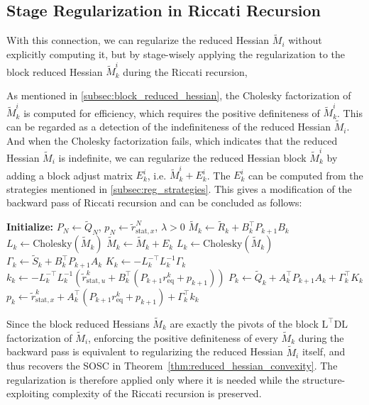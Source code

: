 \documentclass[class=scrbook, crop=false]{standalone}
\begin{document}
\subsection{Stage Regularization in Riccati Recursion}
With this connection, we can regularize the reduced Hessian $\tilde{M}_i$ without explicitly computing it, 
but by stage-wisely applying the regularization to the block reduced Hessian  $\tilde{M}_k^i$ during the Riccati recursion,

As mentioned in \ref{subsec:block_reduced_hessian}, 
the Cholesky factorization of $\tilde{M}_k^i$ is computed for efficiency, which requires the positive definiteness of $\tilde{M}_k^i$.
This can be regarded as a detection of the indefiniteness of the reduced Hessian $\tilde{M}_i$.
And when the Cholesky factorization fails, which indicates that the reduced Hessian $\tilde{M}_i$ is indefinite,
we can regularize the reduced Hessian block $\tilde{M}_k^i$ by adding a block adjust matrix $E_k^i$, i.e. $\tilde{M}_k^i + E_k^i$.
The $E_k^i$ can be computed from the strategies mentioned in \ref{subsec:reg_strategies}.
This gives a modification of the backward pass of Riccati recursion and can be concluded as follows:
\begin{algorithm}[H]
\caption{Backward Pass of Modified Riccati Recursion}
\label{alg:modified_riccati_recursion}
\begin{algorithmic}[1]
\State\textbf{Initialize:} $P_N \gets \tilde{Q}_N$, $p_N \gets \tilde{r}_{\mathrm{stat}, x}^N$, $\lambda > 0$
\Statex 
{}
    \State $\tilde{M}_k \gets \tilde{R}_k + B_k^\top P_{k+1} B_k$
    \State $L_k \gets \mathrm{Cholesky}(\tilde{M}_k)$
        \State $\tilde{M}_k \gets \tilde{M}_k + E_k$ 
        \State $L_k \gets \mathrm{Cholesky}(\tilde{M}_k)$
    \EndIf
    \State $\Gamma_k \gets \tilde{S}_k + B_k^\top P_{k+1} A_k$
    \Statex
    \State $K_k \gets -L_k^{-\top} L_k^{-1} \Gamma_k$
    \State $k_k \gets -L_k^{-\top} L_k^{-1} \left(\tilde{r}_{\mathrm{stat}, u}^k + B_k^\top (P_{k+1} r_{\mathrm{eq}}^k + p_{k+1})\right)$
    \Statex
    \State $P_k \gets \tilde{Q}_k + A_k^\top P_{k+1} A_k + \Gamma_k^\top K_k$
    \State $p_k \gets \tilde{r}_{\mathrm{stat}, x}^k + A_k^\top (P_{k+1} r_{\mathrm{eq}}^k + p_{k+1}) + \Gamma_k^\top k_k$
\EndFor
\end{algorithmic}
\end{algorithm}
Since the block reduced Hessians $\tilde{M}_k$ are exactly the pivots of
the block $\mathrm{L}^\top \mathrm{DL}$ factorization of $\tilde{M}_i$,
enforcing the positive definiteness of every $\tilde{M}_k$ during the backward pass is equivalent to regularizing the reduced Hessian $\tilde{M}_i$ itself, 
and thus recovers the SOSC in Theorem~\ref{thm:reduced_hessian_convexity}.
The regularization is therefore applied only where it is needed while the structure-exploiting complexity of the Riccati recursion is preserved.
\end{document}

